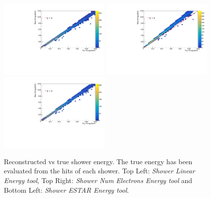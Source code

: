 \begin{figure}[h!]
    \centering
    \includegraphics[width = 0.49\textwidth]{figures-chap4/true_vs_reco_linear.pdf}
    \includegraphics[width = 0.49\textwidth]{figures-chap4/true_vs_reco_oldmethod.pdf}
    \includegraphics[width = 0.49\textwidth]{figures-chap4/true_vs_reco_ESTAR.pdf}
    \captionsetup{width=0.45\textwidth}
    \parbox[b]{0.49\textwidth}%
  {
    \caption[Reconstructed vs true shower energy. The true energy has been evaluated from the hits of each shower.]
    {Reconstructed vs true shower energy. The true energy has been evaluated from the hits of each shower. Top Left: \textit{Shower Linear Energy tool}, Top Right: \textit{Shower Num Electrons Energy tool} and Bottom Left: \textit{Shower ESTAR Energy tool}. \\\\}
    \label{fig:reco_vs_true_hit_level}}
\end{figure}


